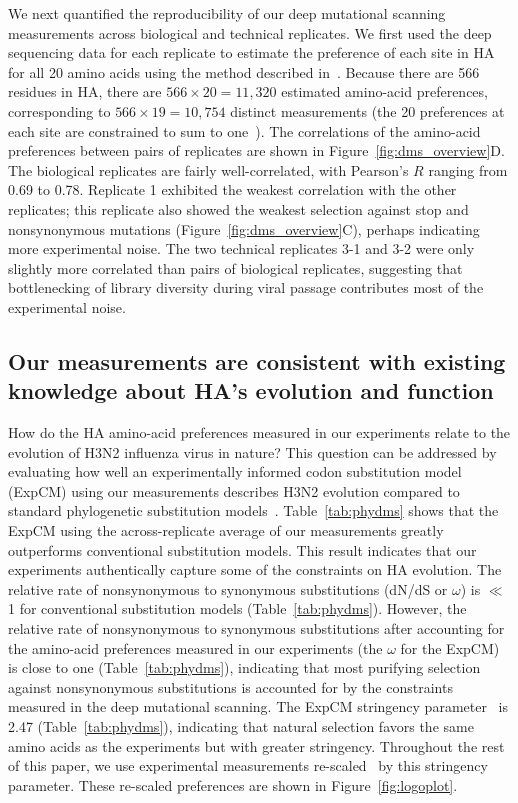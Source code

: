 \documentclass[9pt,twocolumn,twoside]{pnas-new}
\begin{document}
We next quantified the reproducibility of our deep mutational scanning measurements across biological and technical replicates. 
We first used the deep sequencing data for each replicate to estimate the preference of each site in HA for all 20 amino acids using the method described in~\cite{bloom2015software}.
Because there are 566 residues in HA, there are $566 \times 20 = 11,320$ estimated amino-acid preferences, corresponding to $566 \times 19 = 10,754$ distinct measurements (the 20 preferences at each site are constrained to sum to one~\cite{bloom2015software}).
The correlations of the amino-acid preferences between pairs of replicates are shown in Figure~\ref{fig:dms_overview}D.
The biological replicates are fairly well-correlated, with Pearson's $R$ ranging from 0.69 to 0.78. 
Replicate 1 exhibited the weakest correlation with the other replicates; this replicate also showed the weakest selection against stop and nonsynonymous mutations (Figure~\ref{fig:dms_overview}C), perhaps indicating more experimental noise.
The two technical replicates 3-1 and 3-2 were only slightly more correlated than pairs of biological replicates, suggesting that bottlenecking of library diversity during viral passage contributes most of the experimental noise.

\subsection*{Our measurements are consistent with existing knowledge about HA's evolution and function}
How do the HA amino-acid preferences measured in our experiments relate to the evolution of H3N2 influenza virus in nature?
This question can be addressed by evaluating how well an experimentally informed codon substitution model (ExpCM) using our measurements describes H3N2 evolution compared to standard phylogenetic substitution models~\cite{bloom2017identification,hilton2017phydms}.
Table~\ref{tab:phydms} shows that the ExpCM using the across-replicate average of our measurements greatly outperforms conventional substitution models.
This result indicates that our experiments authentically capture some of the constraints on HA evolution. 
The relative rate of nonsynonymous to synonymous substitutions (dN/dS or $\omega$) is $\ll$1 for conventional substitution models (Table~\ref{tab:phydms}).
However, the relative rate of nonsynonymous to synonymous substitutions after accounting for the amino-acid preferences measured in our experiments (the $\omega$ for the ExpCM) is close to one (Table~\ref{tab:phydms}), indicating that most purifying selection against nonsynonymous substitutions is accounted for by the constraints measured in the deep mutational scanning.
The ExpCM stringency parameter~\cite{hilton2017phydms} is 2.47 (Table~\ref{tab:phydms}), indicating that natural selection favors the same amino acids as the experiments but with greater stringency.
Throughout the rest of this paper, we use experimental measurements re-scaled~\cite{bloom2017identification,hilton2017phydms} by this stringency parameter.
These re-scaled preferences are shown in Figure~\ref{fig:logoplot}.
\end{document}
